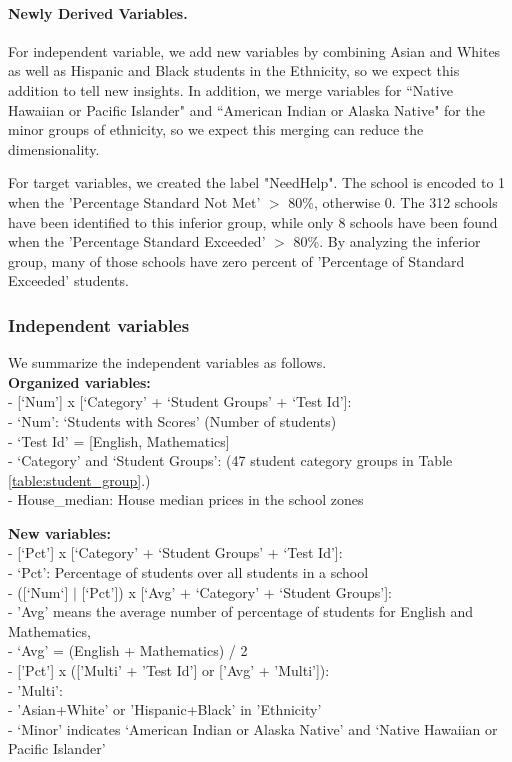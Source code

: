 \documentclass[11pt]{article}
\begin{document}
\paragraph*{Newly Derived Variables.}

For independent variable, 
we add new variables by combining Asian and Whites as well as Hispanic and Black students in the Ethnicity, so we expect this addition to tell new insights.
%
In addition, we merge variables for ``Native Hawaiian or Pacific Islander" and ``American Indian or Alaska Native" for the minor groups of ethnicity, so we expect this merging can reduce the dimensionality.

%
For target variables, we created the label "NeedHelp". The school is encoded to 1 when the 'Percentage Standard Not Met' $>$ 80\%, otherwise 0.
%
The 312 schools have been identified to this inferior group, while only 8 schools have been found when the 'Percentage Standard Exceeded' $>$ 80\%.
%
By analyzing the inferior group, many of those schools have zero percent of 'Percentage of Standard Exceeded' students.

\subsubsection{Independent variables}

We summarize the independent variables as follows.\\
\noindent \textbf{Organized variables:}\\ 
- [`Num'] x [`Category' + `Student Groups' + `Test Id']: \\
\indent    - `Num': `Students with Scores' (Number of students)\\
\indent    - `Test Id' = [English, Mathematics]\\
\indent    - `Category' and `Student Groups': (47 student category groups in Table \ref{table:student_group}.)\\
- House\_median: House median prices in the school zones
    
\noindent \textbf{New variables:}\\ 
- [`Pct'] x [`Category' + `Student Groups' + `Test Id']:\\ 
 \indent   - `Pct': Percentage of students over all students in a school\\
- ([`Num`] $|$ [`Pct']) x [`Avg' + `Category' + `Student Groups']:\\
\indent    - 'Avg' means the average number of percentage of students for English and Mathematics, \\
\indent - `Avg' = (English + Mathematics) / 2\\
- ['Pct'] x (['Multi' + 'Test Id'] or ['Avg' + 'Multi']):\\
\indent    - 'Multi':\\
\indent \indent        - 'Asian+White' or 'Hispanic+Black' in 'Ethnicity'\\
\indent \indent        - `Minor' indicates `American Indian or Alaska Native' and `Native Hawaiian or Pacific Islander'
\end{document}
